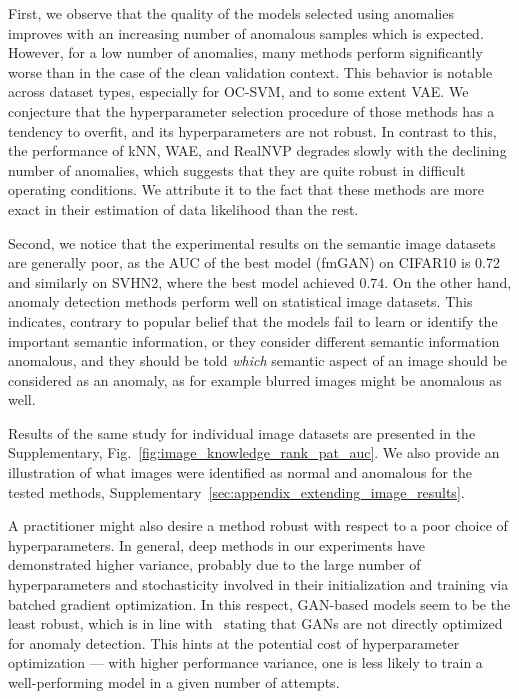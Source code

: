 First, we observe that the quality of the models selected using anomalies improves with an increasing number of anomalous samples which is expected. However, for a low number of anomalies, many methods perform significantly worse than in the case of the clean validation context. This behavior is notable across dataset types, especially for OC-SVM, and to some extent VAE. We conjecture that the hyperparameter selection procedure of those methods has a tendency to overfit, and its hyperparameters are not robust. In contrast to this, the performance of kNN, WAE, and RealNVP degrades slowly with the declining number of anomalies, which suggests that they are quite robust in difficult operating conditions. We attribute it to the fact that these methods are more exact in their estimation of data likelihood than the rest. 

Second, we notice that the experimental results on the semantic image datasets are generally poor, as the AUC of the best model (fmGAN) on CIFAR10 is 0.72 and similarly on SVHN2, where the best model achieved $0.74$. On the other hand, anomaly detection methods perform well on statistical image datasets. This indicates, contrary to popular belief that the models fail to learn or identify the important semantic information, or they consider different semantic information anomalous, and they should be told \emph{which} semantic aspect of an image should be considered as an anomaly, as for example blurred images might be anomalous as well.

Results of the same study for individual image datasets are presented in the Supplementary, Fig.~\ref{fig:image_knowledge_rank_pat_auc}. We also provide an illustration of what images were identified as normal and anomalous for the tested methods, Supplementary~\ref{sec:appendix_extending_image_results}.

A practitioner might also desire a method robust with respect to a poor choice of hyperparameters.  In general, deep methods in our experiments have demonstrated higher variance, probably due to the large number of hyperparameters and stochasticity involved in their initialization and training via batched gradient optimization. In this respect, GAN-based models seem to be the least robust, which is in line with~\cite{deecke2018image} stating that GANs are not directly optimized for anomaly detection. This hints at the potential cost of hyperparameter optimization --- with higher performance variance, one is less likely to train a well-performing model in a given number of attempts. 

